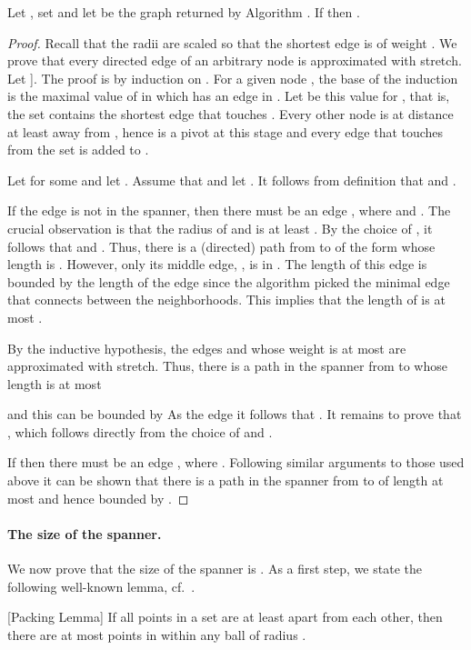 \documentclass[proceedings]{stacs}
\theoremstyle{plain}\newtheorem{satz}[thm]{Satz}
\theoremstyle{definition}\newtheorem{crucial}[thm]{Crucial Definition}
\begin{document}
\begin{lemma}[Stretch]
Let , set  and let
 be the graph returned by Algorithm
. If  then .
\end{lemma}
\begin{proof}
Recall that the radii are scaled so that the shortest edge is of
weight . We prove that every directed edge of an arbitrary node
 is approximated with  stretch. Let ]. The proof is by induction on
. For a given node , the base of the induction is the
maximal value of  in which  has an edge in .
Let  be this value for , that is, the set 
contains the shortest edge that touches . Every other node is
at distance at least  away from , hence  is a pivot
at this stage and every edge that touches  from the set
 is added to .

Let  for some  and let
. Assume that  and let
. It follows from definition that  and .

If the edge  is not in the spanner, then there must be an
edge , where  and . The crucial observation
is that the radius of  and  is at least . By
the choice of , it follows that 
and . Thus, there is a (directed)
path from  to  of the form  whose length is .
However, only its middle edge, , is in
. The length of this edge is bounded by the length
of the edge  since the algorithm picked the minimal edge
that connects between the neighborhoods. This implies that the
length of  is at most .

By the inductive hypothesis, the edges  and
 whose weight is at most  are
approximated with  stretch. Thus, there is a path in
the spanner from  to  whose length is at most

and this can be bounded by
 As the edge  it follows that . It
remains to prove that , which follows directly from the choice of 
and .

If  then there must be an edge , where . Following similar
arguments to those used above it can be shown that there is a path
in the spanner from  to  of length at most
 and hence bounded by
.
\end{proof}

\paragraph{The size of the spanner.}
We now prove that the size of the spanner
 is . As a
first step, we state the following well-known lemma,
cf.~\cite{GaoGuiNgu04}.

\begin{lemma}\label{L-pack}[Packing Lemma]
If all points in a set  are at least  apart
from each other, then there are at most  points in
 within any ball  of radius .
\end{lemma}
\end{document}
